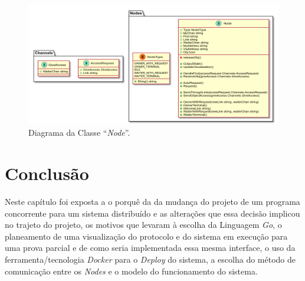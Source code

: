 \begin{figure}[h!]
\centering
\includegraphics[width=400pt]{node_class_diagram.png}
\caption{Diagrama da Classe ``\emph{Node}''.}
\label{engenharia:img:classe}
\end{figure}




\section{Conclusão}
\label{engenharia:sec:conclusão} 
Neste capítulo foi exposta a o porquê da da mudança do projeto de um programa concorrente para um sistema distribuído e as alterações que essa decisão implicou no trajeto do projeto,
os motivos que levaram à escolha da Linguagem \emph{Go}, o planeamento de uma visualização do protocolo e do sistema em execução para uma prova parcial
e de como seria implementada essa
mesma interface, o uso da ferramenta/tecnologia \emph{Docker} para o \emph{Deploy} do sistema, a escolha do método de comunicação entre os \emph{Nodes} e o modelo
do funcionamento do sistema.

